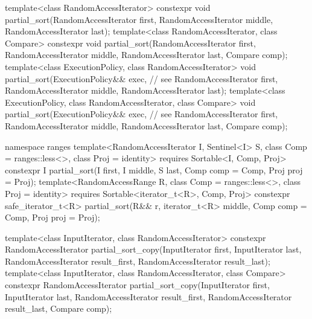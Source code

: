 \begin{codeblock}
  template<class RandomAccessIterator>
    constexpr void partial_sort(RandomAccessIterator first,
                                RandomAccessIterator middle,
                                RandomAccessIterator last);
  template<class RandomAccessIterator, class Compare>
    constexpr void partial_sort(RandomAccessIterator first,
                                RandomAccessIterator middle,
                                RandomAccessIterator last, Compare comp);
  template<class ExecutionPolicy, class RandomAccessIterator>
    void partial_sort(ExecutionPolicy&& exec, // see 
                      RandomAccessIterator first,
                      RandomAccessIterator middle,
                      RandomAccessIterator last);
  template<class ExecutionPolicy, class RandomAccessIterator, class Compare>
    void partial_sort(ExecutionPolicy&& exec, // see 
                      RandomAccessIterator first,
                      RandomAccessIterator middle,
                      RandomAccessIterator last, Compare comp);
\end{codeblock}\begin{addedblock}\begin{codeblock}
  namespace ranges {
    template<RandomAccessIterator I, Sentinel<I> S, class Comp = ranges::less<>,
        class Proj = identity>
      requires Sortable<I, Comp, Proj>
      constexpr I
        partial_sort(I first, I middle, S last, Comp comp = Comp{}, Proj proj = Proj{});
    template<RandomAccessRange R, class Comp = ranges::less<>, class Proj = identity>
      requires Sortable<iterator_t<R>, Comp, Proj>
      constexpr safe_iterator_t<R>
        partial_sort(R&& r, iterator_t<R> middle, Comp comp = Comp{},
                     Proj proj = Proj{});
  }
\end{codeblock}\end{addedblock}\begin{codeblock}
  template<class InputIterator, class RandomAccessIterator>
    constexpr RandomAccessIterator
      partial_sort_copy(InputIterator first, InputIterator last,
                        RandomAccessIterator result_first,
                        RandomAccessIterator result_last);
  template<class InputIterator, class RandomAccessIterator, class Compare>
    constexpr RandomAccessIterator
      partial_sort_copy(InputIterator first, InputIterator last,
                        RandomAccessIterator result_first,
                        RandomAccessIterator result_last,
                        Compare comp);

\end{codeblock}
